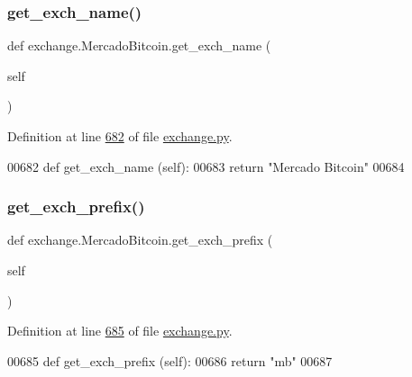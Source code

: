 \subsubsection{\texorpdfstring{get\+\_\+exch\+\_\+name()}{get\_exch\_name()}}
{\footnotesize\ttfamily def exchange.\+Mercado\+Bitcoin.\+get\+\_\+exch\+\_\+name (\begin{DoxyParamCaption}\item[{}]{self }\end{DoxyParamCaption})}



Definition at line \hyperlink{exchange_8py_source_l00682}{682} of file \hyperlink{exchange_8py_source}{exchange.\+py}.


\begin{DoxyCode}
00682     \textcolor{keyword}{def }get\_exch\_name (self):
00683         \textcolor{keywordflow}{return} \textcolor{stringliteral}{"Mercado Bitcoin"}
00684     
\end{DoxyCode}
\mbox{\label{classexchange_1_1_mercado_bitcoin_a61500a3a404e9dc0279717d1d2de85f4}} 
\subsubsection{\texorpdfstring{get\+\_\+exch\+\_\+prefix()}{get\_exch\_prefix()}}
{\footnotesize\ttfamily def exchange.\+Mercado\+Bitcoin.\+get\+\_\+exch\+\_\+prefix (\begin{DoxyParamCaption}\item[{}]{self }\end{DoxyParamCaption})}



Definition at line \hyperlink{exchange_8py_source_l00685}{685} of file \hyperlink{exchange_8py_source}{exchange.\+py}.


\begin{DoxyCode}
00685     \textcolor{keyword}{def }get\_exch\_prefix (self):
00686         \textcolor{keywordflow}{return} \textcolor{stringliteral}{"mb"}
00687         
\end{DoxyCode}
\mbox{\label{classexchange_1_1_mercado_bitcoin_a2e6fe3e59daf6791688af7ed15772452}} 
